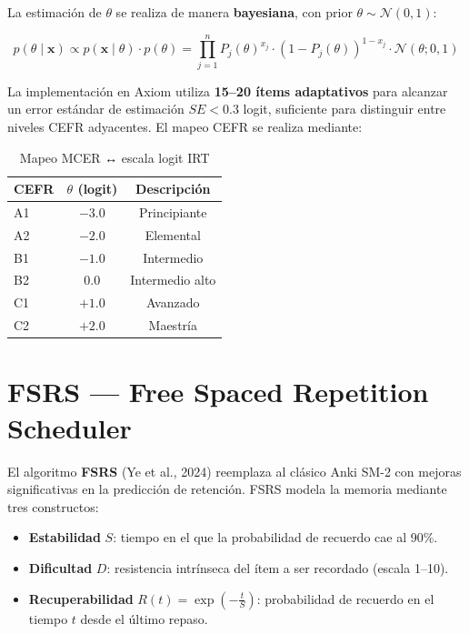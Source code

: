 \documentclass[10pt,a4paper,oneside]{report}
\begin{document}
La estimación de $\theta$ se realiza de manera \textbf{bayesiana}, con prior $\theta \sim \mathcal{N}(0, 1)$:

\begin{equation}
p(\theta \mid \mathbf{x}) \propto p(\mathbf{x} \mid \theta) \cdot p(\theta) = \prod_{j=1}^{n} P_j(\theta)^{x_j} \cdot (1 - P_j(\theta))^{1 - x_j} \cdot \mathcal{N}(\theta; 0, 1)
\end{equation}

La implementación en Axiom utiliza \textbf{15--20 ítems adaptativos} para alcanzar un error estándar de estimación $SE < 0.3$ logit, suficiente para distinguir entre niveles CEFR adyacentes. El mapeo CEFR se realiza mediante:

\begin{table}[H]
\centering
\begin{tabular}{lcc}
\toprule
\textbf{CEFR} & \textbf{$\theta$ (logit)} & \textbf{Descripción} \\
\midrule
A1 & $-3.0$ & Principiante \\
A2 & $-2.0$ & Elemental \\
B1 & $-1.0$ & Intermedio \\
B2 & $0.0$ & Intermedio alto \\
C1 & $+1.0$ & Avanzado \\
C2 & $+2.0$ & Maestría \\
\bottomrule
\end{tabular}
\caption{Mapeo MCER ↔ escala logit IRT}
\end{table}

\section{FSRS — Free Spaced Repetition Scheduler}
El algoritmo \textbf{FSRS} (Ye et al., 2024) reemplaza al clásico Anki SM-2 con mejoras significativas en la predicción de retención. FSRS modela la memoria mediante tres constructos:

\begin{itemize}[leftmargin=1.4em]
\item \textbf{Estabilidad} $S$: tiempo en el que la probabilidad de recuerdo cae al 90\%.
\item \textbf{Dificultad} $D$: resistencia intrínseca del ítem a ser recordado (escala 1--10).
\item \textbf{Recuperabilidad} $R(t) = \exp\left(-\frac{t}{S}\right)$: probabilidad de recuerdo en el tiempo $t$ desde el último repaso.
\end{itemize}
\end{document}
